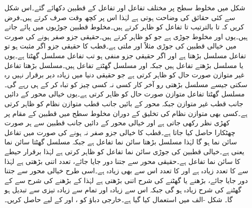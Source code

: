 شکل  میں مخلوط سطح پر مختلف تفاعل اور تفاعل کے  قطبین  دکھائے گئے۔اس شکل سے کئی حقائق کی وضاحت ہوتی ہے لہٰذا اس پر کچھ وقت صرف کرتے ہیں۔فرض کریں کہ  تا  بالترتیب  تا  تفاعل کو ظاہر کرتے ہیں۔مخلوط قطبین جوڑیوں میں پائے جاتے ہیں۔یوں  اور  مخلوط جوڑی ہے جو  کو ظاہر کرتے ہیں۔حقیقی جزو صفر ہونے کی صورت میں خیالی قطبین کی جوڑی مثلاً  اور  ملتی ہے۔قطب کا حقیقی جزو اگر مثبت ہو تو تفاعل مسلسل بڑھتا ہے اور اگر حقیقی  جزو منفی ہو تب تفاعل مسلسل گھٹتا ہے۔یوں  یا  مسلسل بڑھتے تفاعل ہیں جبکہ  اور  مسلسل گھٹتے تفاعل ہیں۔مسلسل بڑھتا تفاعل غیر متوازن صورت حال کو ظاہر کرتی ہے جو حقیقی دنیا میں زیادہ دیر برقرار نہیں رہ سکتی جیسے مسلسل بڑھتی رو آخر کار کسی نہ کسی چیز کو تباہ کر کے ہی رہے گی۔مسلسل گھٹتا تفاعل متوازن صورت حال کو ظاہر کرتی ہے۔یوں خیالی محور کے دائیں جانب قطب غیر متوازن جبکہ محور کے بائیں جانب قطب متوازن نظام کو ظاہر کرتی ہے۔کسی بھی متوازن نظام کی تخلیق کے دوران مخلوط سطح میں قطبین کے مقام پر کھڑی نظر رکھی جاتی ہے اور خیالی محور کے دائیں جانب قطبین سے ہر صورت چھٹکارا حاصل کیا جاتا ہے۔قطب کا خیالی جزو صفر نہ ہونے کی صورت میں تفاعل سائن نما ہو گا لہٰذا  مسلسل بڑھتا سائن نما تفاعل ہے جبکہ   مسلسل گھٹتا سائن نما یعنی  ہے۔خیالی قطبین کی جوڑی سائن نما تفاعل کو ظاہر کرتی ہے لہٰذا  برقرار حیطے کا سائن نما تفاعل ہے۔حقیقی محور سے جتنا دور جایا جائے، تعدد اتنی بڑھتی ہے لہٰذا  سے  کا تعدد زیادہ ہے اور  کا تعدد اس سے بھی زیادہ ہے۔اسی طرح خیالی محور سے جتنا دور جایا جائے، بڑھنے یا گھٹنے کی شرح اتنی بڑھتی ہے لہٰذا  کے بڑھنے کی شرح سے  کے گھٹنے کی شرح زیادہ ہو گی جبکہ  اس سے زیادہ اور  تمام سے زیادہ تیزی سے تبدیل ہو گا۔
شکل -الف میں  استعمال کیا گیا ہے۔خارجی دباؤ  کو ،  اور  کے لیے حاصل کریں۔

